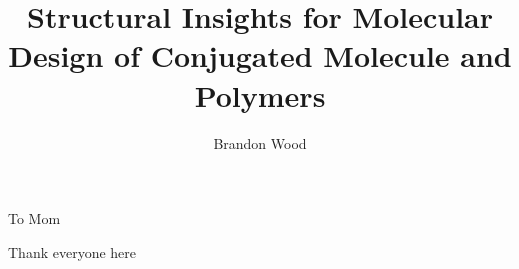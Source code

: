 \documentclass{ucbthesis}
\begin{document}

\title{Structural Insights for Molecular Design of Conjugated Molecule and Polymers}
\author{Brandon Wood}




\maketitle
\approvalpage
\copyrightpage



\begin{frontmatter}

\begin{dedication}
\null\vfil
\begin{center}
To Mom\\\vspace{12pt}
\end{center}
\vfil\null
\end{dedication}


\tableofcontents
\clearpage
\listoffigures
\clearpage
\listoftables

\begin{acknowledgements}
Thank everyone here

\end{acknowledgements}

\end{frontmatter}
\end{document}
